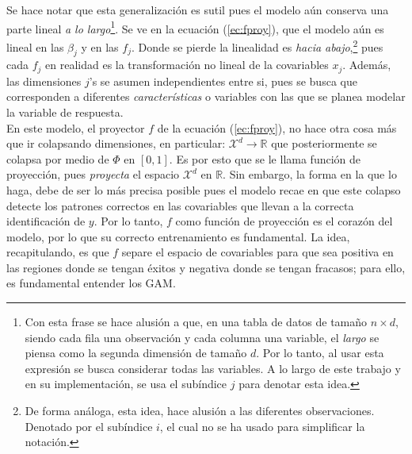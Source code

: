 \documentclass[../Main/Main.tex]{subfiles}
\begin{document}
Se hace notar que esta generalización es sutil pues el modelo aún conserva una parte lineal \textit{a lo largo}\footnote{Con esta frase se hace alusión a que, en una tabla de datos de tamaño $n \times d$, siendo cada fila una observación y cada columna una variable, el \textit{largo} se piensa como la segunda dimensión de tamaño $d$. Por lo tanto, al usar esta expresión se busca considerar todas las variables. A lo largo de este trabajo y en su implementación, se usa el subíndice $j$ para denotar esta idea.}. Se ve en la ecuación (\ref{ec:fproy}), que el modelo aún es lineal en las $\beta_j$ y en las $f_j$. Donde se pierde la linealidad es \textit{hacia abajo},\footnote{De forma análoga, esta idea, hace alusión a las diferentes observaciones. Denotado por el subíndice $i$, el cual no se ha usado para simplificar la notación.} pues cada $f_j$ en realidad es la transformación no lineal de la covariables $x_j$. Además, las dimensiones $j$'s se asumen independientes entre si, pues se busca que corresponden a diferentes \textit{características} o variables con las que se planea modelar la variable de respuesta.\\

En este modelo, el proyector $f$ de la ecuación (\ref{ec:fproy}), no hace otra cosa más que ir colapsando dimensiones, en particular: $\mathcal{X}^d \rightarrow \mathbb{R}$ que posteriormente se colapsa por medio de $\Phi$ en $[0,1]$. Es por esto que se le llama función de proyección, pues \textit{proyecta} el espacio $\mathcal{X}^d$ en $\mathbb{R}$. Sin embargo, la forma en la que lo haga, debe de ser lo más precisa posible pues el modelo recae en que este colapso detecte los patrones correctos en las covariables que llevan a la correcta identificación de $y$. Por lo tanto, $f$ como función de proyección es el corazón del modelo, por lo que su correcto entrenamiento es fundamental. La idea, recapitulando, es que $f$ separe el espacio de covariables para que sea positiva en las regiones donde se tengan éxitos y negativa donde se tengan fracasos; para ello, es fundamental entender los GAM.\\
\end{document}
